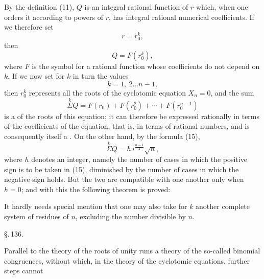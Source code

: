 
By the definition (11), $Q$ is an integral rational function
of $r$ which, when one orders it according to powers of $r$, has
integral rational numerical coefficients. If we therefore set
\[
r = r_0^k,
\]
then
\[
Q = F(r_0^k),
\]
where $F$ is the symbol for a rational function whose
coefficients do not depend on $k$. If we now set for
$k$ in turn the values
\[
k = 1,\ 2 \ldots n-1,
\]
then $r_0^k$ represents all the roots of the cyclotomic equation $X_n = 0$,
and the sum
\[
\overset{k}{\Sigma} Q = F(r_0) + F(r_0^2) + \cdots + F(r_0^{n-1})
\]
is a  of the roots of this equation; it
can therefore be expressed rationally in terms of the coefficients of the equation,
that is, in terms of rational numbers, and is consequently itself a
. On the other hand, by the formula (15),
\[
\overset{k}{\Sigma} Q = h\, i^{\frac{n-1}{2}} \sqrt{n},
\]
where $h$ denotes an integer, namely the number of cases
in which the positive sign is to be taken in (15), diminished by
the number of cases in which the negative sign holds. But the two
are compatible with one another only when $h = 0$; and
with this the following theorem is proved:


It hardly needs special mention that one may also take for $k$
another complete system of residues of $n$, excluding the number
divisible by $n$.

\begin{center}
\S.\,136.\\[2pt]
\end{center}

Parallel to the theory of the roots of unity runs a theory of the
so-called binomial congruences, without which, in the theory of the
cyclotomic equations, further steps cannot
